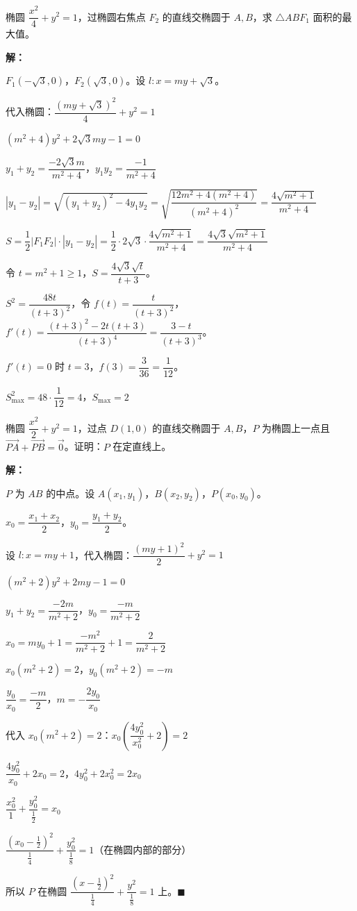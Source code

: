 \documentclass[12pt, a4paper]{ctexart}
\begin{document}
\begin{examplebox}[【例题5】面积最值]
椭圆 $\dfrac{x^2}{4}+y^2=1$，过椭圆右焦点 $F_2$ 的直线交椭圆于 $A,B$，求 $\triangle ABF_1$ 面积的最大值。

\textbf{解：}

$F_1(-\sqrt{3},0)$，$F_2(\sqrt{3},0)$。设 $l: x=my+\sqrt{3}$。

代入椭圆：$\dfrac{(my+\sqrt{3})^2}{4}+y^2=1$

$(m^2+4)y^2+2\sqrt{3}my-1=0$

$y_1+y_2=\dfrac{-2\sqrt{3}m}{m^2+4}$，$y_1 y_2=\dfrac{-1}{m^2+4}$

$|y_1-y_2|=\sqrt{(y_1+y_2)^2-4y_1 y_2}=\sqrt{\dfrac{12m^2+4(m^2+4)}{(m^2+4)^2}}=\dfrac{4\sqrt{m^2+1}}{m^2+4}$

$S=\dfrac{1}{2}|F_1F_2|\cdot|y_1-y_2|=\dfrac{1}{2}\cdot 2\sqrt{3}\cdot\dfrac{4\sqrt{m^2+1}}{m^2+4}=\dfrac{4\sqrt{3}\sqrt{m^2+1}}{m^2+4}$

令 $t=m^2+1\geq 1$，$S=\dfrac{4\sqrt{3}\sqrt{t}}{t+3}$。

$S^2=\dfrac{48t}{(t+3)^2}$，令 $f(t)=\dfrac{t}{(t+3)^2}$，$f'(t)=\dfrac{(t+3)^2-2t(t+3)}{(t+3)^4}=\dfrac{3-t}{(t+3)^3}$。

$f'(t)=0$ 时 $t=3$，$f(3)=\dfrac{3}{36}=\dfrac{1}{12}$。

$S_{\max}^2=48\cdot\dfrac{1}{12}=4$，$S_{\max}=\boxed{2}$
\end{examplebox}

\begin{examplebox}[【例题6】定点问题]
椭圆 $\dfrac{x^2}{2}+y^2=1$，过点 $D(1,0)$ 的直线交椭圆于 $A,B$，$P$ 为椭圆上一点且 $\overrightarrow{PA}+\overrightarrow{PB}=\overrightarrow{0}$。证明：$P$ 在定直线上。

\textbf{解：}

$P$ 为 $AB$ 的中点。设 $A(x_1,y_1)$，$B(x_2,y_2)$，$P(x_0,y_0)$。

$x_0=\dfrac{x_1+x_2}{2}$，$y_0=\dfrac{y_1+y_2}{2}$。

设 $l: x=my+1$，代入椭圆：$\dfrac{(my+1)^2}{2}+y^2=1$

$(m^2+2)y^2+2my-1=0$

$y_1+y_2=\dfrac{-2m}{m^2+2}$，$y_0=\dfrac{-m}{m^2+2}$

$x_0=my_0+1=\dfrac{-m^2}{m^2+2}+1=\dfrac{2}{m^2+2}$

$x_0(m^2+2)=2$，$y_0(m^2+2)=-m$

$\dfrac{y_0}{x_0}=\dfrac{-m}{2}$，$m=-\dfrac{2y_0}{x_0}$

代入 $x_0(m^2+2)=2$：$x_0\left(\dfrac{4y_0^2}{x_0^2}+2\right)=2$

$\dfrac{4y_0^2}{x_0}+2x_0=2$，$4y_0^2+2x_0^2=2x_0$

$\dfrac{x_0^2}{1}+\dfrac{y_0^2}{\frac{1}{2}}=x_0$

$\dfrac{(x_0-\frac{1}{2})^2}{\frac{1}{4}}+\dfrac{y_0^2}{\frac{1}{8}}=1$（在椭圆内部的部分）

所以 $P$ 在椭圆 $\dfrac{(x-\frac{1}{2})^2}{\frac{1}{4}}+\dfrac{y^2}{\frac{1}{8}}=1$ 上。$\blacksquare$
\end{examplebox}
\end{document}
